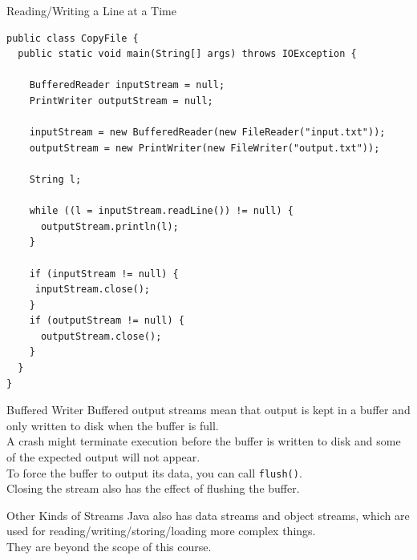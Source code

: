 \documentclass[aspectratio=169]{beamer}
\begin{document}
\begin{frame}[fragile]{Reading/Writing a Line at a Time}
\begin{Verbatim}[fontsize=\tiny]
public class CopyFile {
  public static void main(String[] args) throws IOException {

    BufferedReader inputStream = null;
    PrintWriter outputStream = null;

    inputStream = new BufferedReader(new FileReader("input.txt"));
    outputStream = new PrintWriter(new FileWriter("output.txt"));

    String l;
    
    while ((l = inputStream.readLine()) != null) {
      outputStream.println(l);
    }

    if (inputStream != null) {
     inputStream.close();
    }
    if (outputStream != null) {
      outputStream.close();
    }
  }
}
\end{Verbatim}
\end{frame}



\begin{frame}{Buffered Writer}
Buffered output streams mean that output is kept in a buffer and only written to disk when the buffer is full. \\
\vspace{1em}
A crash might terminate execution before the buffer is written to disk and some of the expected output will not appear. \\
\vspace{1em}
To force the buffer to output its data, you can call \texttt{flush()}. \\
\vspace{1em}
Closing the stream also has the effect of flushing the buffer.
\end{frame}



\begin{frame}{Other Kinds of Streams}
Java also has data streams and object streams, which are used for reading/writing/storing/loading more complex things. \\
\vspace{2em}
They are beyond the scope of this course.
\end{frame}
\end{document}

